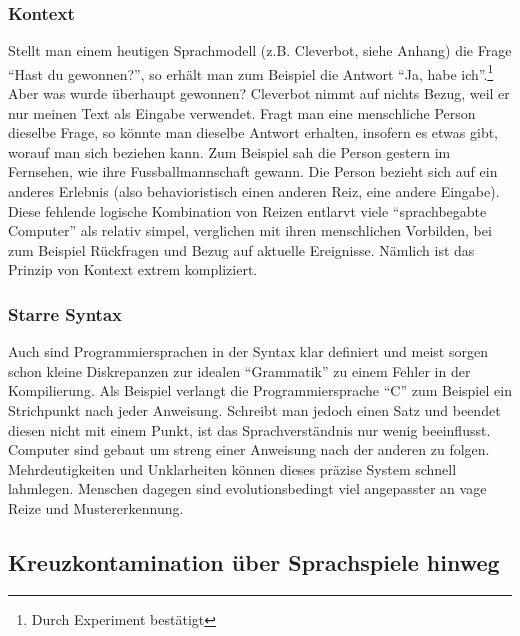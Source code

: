 \documentclass[10pt,a4paper]{article}
\begin{document}
\subsubsection{Kontext}
Stellt man einem heutigen Sprachmodell (z.B. Cleverbot, siehe Anhang) die Frage \enquote{Hast du gewonnen?}, so erhält man zum Beispiel die Antwort \enquote{Ja, habe ich}.\footnote{Durch Experiment bestätigt} Aber was wurde überhaupt gewonnen? Cleverbot nimmt auf nichts Bezug, weil er nur meinen Text als Eingabe verwendet. Fragt man eine menschliche Person dieselbe Frage, so könnte man dieselbe Antwort erhalten, insofern es etwas gibt, worauf man sich beziehen kann. Zum Beispiel sah die Person gestern im Fernsehen, wie ihre Fussballmannschaft gewann. Die Person bezieht sich auf ein anderes Erlebnis (also behavioristisch einen anderen Reiz, eine andere Eingabe). \\
Diese fehlende logische Kombination von Reizen entlarvt viele \enquote{sprachbegabte Computer} als relativ simpel, verglichen mit ihren menschlichen Vorbilden, bei zum Beispiel Rückfragen und Bezug auf aktuelle Ereignisse. Nämlich ist das Prinzip von Kontext extrem kompliziert.

\subsubsection{Starre Syntax}
Auch sind Programmiersprachen in der Syntax klar definiert und meist sorgen schon kleine Diskrepanzen zur idealen \enquote{Grammatik} zu einem Fehler in der Kompilierung. Als Beispiel verlangt die Programmiersprache \enquote{C} zum Beispiel ein Strichpunkt nach jeder Anweisung. Schreibt man jedoch einen Satz und beendet diesen nicht mit einem Punkt, ist das Sprachverständnis nur wenig beeinflusst. Computer sind gebaut um streng einer Anweisung nach der anderen zu folgen. Mehrdeutigkeiten und Unklarheiten können dieses präzise System schnell lahmlegen. Menschen dagegen sind evolutionsbedingt viel angepasster an vage Reize und Mustererkennung.

\subsection{Kreuzkontamination über Sprachspiele hinweg}
\end{document}
